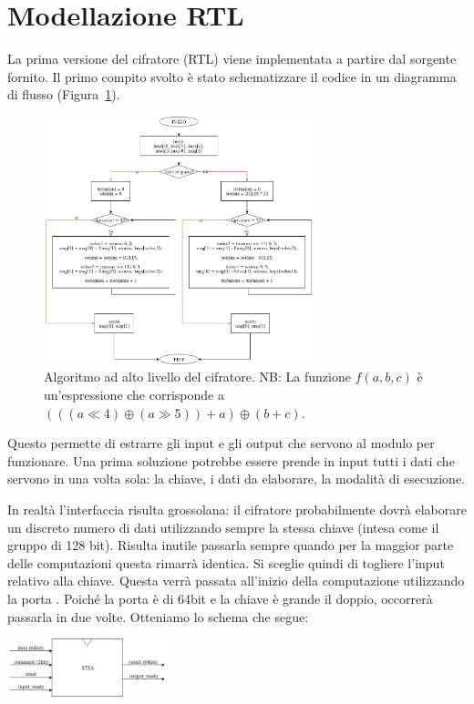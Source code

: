 

\section{Modellazione RTL}

La prima versione del cifratore (RTL) viene implementata a partire dal sorgente fornito. Il primo compito svolto è stato schematizzare il codice in un diagramma di flusso (Figura~\ref{fig:algo}). 

\begin{figure}[htbp]
    \centering
    \includegraphics[width=0.7\textwidth]{schemi/algo.png}
    \caption{Algoritmo ad alto livello del cifratore. NB: La funzione $f(a,b,c)$ è un'espressione che corrisponde a $(((a \ll 4) \oplus (a \gg 5)) + a) \oplus (b + c)$.}
    \label{fig:algo}
\end{figure}

Questo permette di estrarre gli input e gli output che servono al modulo per funzionare. Una prima soluzione potrebbe essere prende in input tutti i dati che servono in una volta sola: la chiave, i dati da elaborare, la modalità di esecuzione.

In realtà l'interfaccia risulta grossolana: il cifratore probabilmente dovrà elaborare un discreto numero di dati utilizzando sempre la stessa chiave (intesa come il gruppo di 128 bit). Risulta inutile passarla sempre quando per la maggior parte delle computazioni questa rimarrà identica. Si sceglie quindi di togliere l'input relativo alla chiave. Questa verrà passata all'inizio della computazione utilizzando la porta . Poiché la porta  è di 64bit e la chiave è grande il doppio, occorrerà passarla in due volte. Otteniamo lo schema che segue:
\begin{center}
    \includegraphics[width=0.35\textwidth]{schemi/rtl_interface.png}
\end{center}

